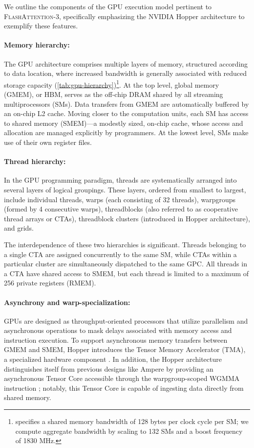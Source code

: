We outline the components of the GPU execution model pertinent to \textsc{FlashAttention-3}, specifically emphasizing the NVIDIA Hopper architecture to exemplify these features.

\paragraph{Memory hierarchy:} The GPU architecture comprises multiple layers of memory, structured according to data location, where increased bandwidth is generally associated with reduced storage capacity (\cref{tab:gpu-hierarchy})\footnote{\citet{luo2024benchmarking} specifies a shared memory bandwidth of 128 bytes per clock cycle per SM; we compute aggregate bandwidth by scaling to 132 SMs and a boost frequency of 1830 MHz.}. At the top level, global memory (GMEM), or HBM, serves as the off-chip DRAM shared by all streaming multiprocessors (SMs). Data transfers from GMEM are automatically buffered by an on-chip L2 cache. Moving closer to the computation units, each SM has access to shared memory (SMEM)—a modestly sized, on-chip cache, whose access and allocation are managed explicitly by programmers. At the lowest level, SMs make use of their own register files.

\paragraph{Thread hierarchy:} In the GPU programming paradigm, threads are systematically arranged into several layers of logical groupings. These layers, ordered from smallest to largest, include individual threads, warps (each consisting of 32 threads), warpgroups (formed by 4 consecutive warps), threadblocks (also referred to as cooperative thread arrays or CTAs), threadblock clusters (introduced in Hopper architecture), and grids.

The interdependence of these two hierarchies is significant. Threads belonging to a single CTA are assigned concurrently to the same SM, while CTAs within a particular cluster are simultaneously dispatched to the same GPC. All threads in a CTA have shared access to SMEM, but each thread is limited to a maximum of 256 private registers (RMEM).

\paragraph{Asynchrony and warp-specialization:}

GPUs are designed as throughput-oriented processors that utilize parallelism and asynchronous operations to mask delays associated with memory access and instruction execution. To support asynchronous memory transfers between GMEM and SMEM, Hopper introduces the Tensor Memory Accelerator (TMA), a specialized hardware component \cite[\S7.29]{cuda}. In addition, the Hopper architecture distinguishes itself from previous designs like Ampere by providing an asynchronous Tensor Core accessible through the warpgroup-scoped WGMMA instruction \cite[\S9.7.14]{ptx}; notably, this Tensor Core is capable of ingesting data directly from shared memory.


